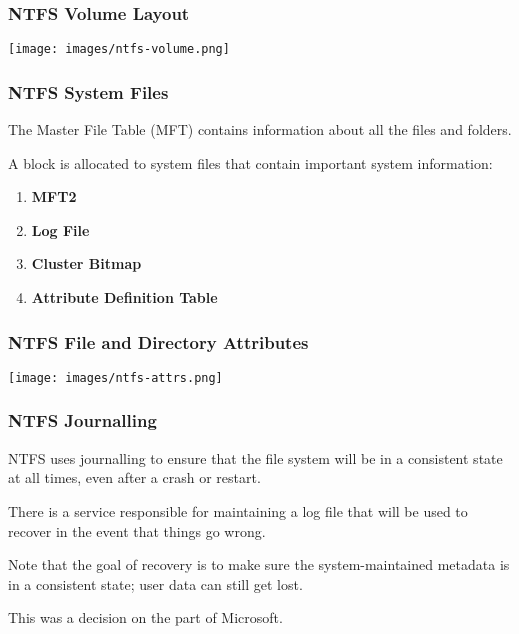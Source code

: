 \begin{frame}
\frametitle{NTFS Volume Layout}

\begin{center}
	\texttt{[image: images/ntfs-volume.png]}
\end{center}

\end{frame}

\begin{frame}
\frametitle{NTFS System Files}

The Master File Table (MFT) contains information about all the files and folders. 

A block is allocated to system files that contain important system information:

\begin{enumerate}
	\item \textbf{MFT2}
	\item \textbf{Log File}
	\item \textbf{Cluster Bitmap}
	\item \textbf{Attribute Definition Table}
\end{enumerate}
\end{frame}



\begin{frame}
\frametitle{NTFS File and Directory Attributes}

\begin{center}
	\texttt{[image: images/ntfs-attrs.png]}
\end{center}


\end{frame}

\begin{frame}
\frametitle{NTFS Journalling}

NTFS uses journalling to ensure that the file system will be in a consistent state at all times, even after a crash or restart. 

There is a service responsible for maintaining a log file that will be used to recover in the event that things go wrong.  

Note that the goal of recovery is to make sure the system-maintained metadata is in a consistent state; user data can still get lost. 

This was a decision on the part of Microsoft.


\end{frame}

